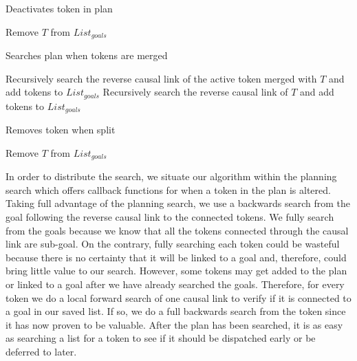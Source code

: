 \begin{algorithm}
\caption{Deactivates token in plan}
\label{NotifyDeactivated}
\begin{algorithmic}
	\State Remove $T$ from $List_{goals}$
\EndIf
\EndFunction
\end{algorithmic}
\end{algorithm}

\begin{algorithm}
\caption{Searches plan when tokens are merged}
\label{NotifyMerged}
\begin{algorithmic}
	\State Recursively search the reverse causal link of the active token merged with $T$ and add tokens to $List_{goals}$
	\State Recursively search the reverse causal link of $T$ and add tokens to $List_{goals}$
\EndIf
\EndFunction
\end{algorithmic}
\end{algorithm}

\begin{algorithm}
\caption{Removes token when split}
\label{NotifySplit}
\begin{algorithmic}
	\State Remove $T$ from $List_{goals}$
\EndIf
\EndFunction
\end{algorithmic}
\end{algorithm}

In order to distribute the search, we situate our algorithm within the
planning search which offers callback functions for when a token in
the plan is altered. Taking full advantage of the planning search, we
use a backwards search from the goal following the reverse causal link
to the connected tokens.  We fully search from the goals because we
know that all the tokens connected through the causal link are
sub-goal.  On the contrary, fully searching each token could be
wasteful because there is no certainty that it will be linked to a
goal and, therefore, could bring little value to our search. However,
some tokens may get added to the plan or linked to a goal after we
have already searched the goals. Therefore, for every token we do a
local forward search of one causal link to verify if it is connected
to a goal in our saved list.  If so, we do a full backwards search
from the token since it has now proven to be valuable. After the plan
has been searched, it is as easy as searching a list for a token to
see if it should be dispatched early or be deferred to later.




